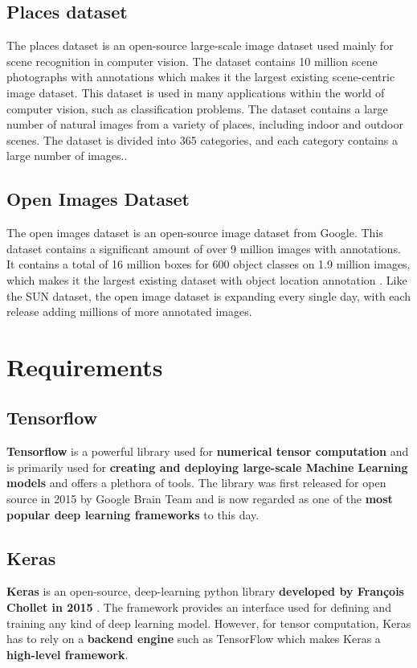 \subsection{Places dataset}
The places dataset is an open-source large-scale image dataset used mainly for scene recognition in computer vision. The dataset contains 10 million scene photographs with annotations which makes it the largest existing scene-centric image dataset. This dataset is used in many applications within the world of computer vision, such as classification problems. The dataset contains a large number of natural images from a variety of places, including indoor and outdoor scenes. The dataset is divided into 365 categories, and each category contains a large number of images.\cite{Zhou1109}.


\subsection{Open Images Dataset}
The open images dataset is an open-source image dataset from Google. This dataset contains a significant amount of over 9 million images with annotations. It contains a total of 16 million boxes for 600 object classes on 1.9 million images, which makes it the largest existing dataset with object location annotation \cite{2020}. Like the SUN dataset, the open image dataset is expanding every single day, with each release adding millions of more annotated images. 
\newpage

\section{Requirements}
\subsection{Tensorflow}
\textbf{Tensorflow} is a powerful library used for \textbf{numerical tensor computation} and is primarily used for \textbf{creating and deploying large-scale Machine Learning models} and offers a plethora of tools. The library was first released for open source in 2015 by Google Brain Team and is now regarded as one of the\textbf{ most popular deep learning frameworks} to this day\cite{10.5555/3153997}. 


\subsection{Keras}
\textbf{Keras} is an open-source, deep-learning python library \textbf{developed by François Chollet in 2015} \cite{franoischollet2017learning}. The framework provides an interface used for defining and training any kind of deep learning model. However, for tensor computation, Keras has to rely on a \textbf{backend engine} such as TensorFlow which makes Keras a \textbf{high-level framework}. 


